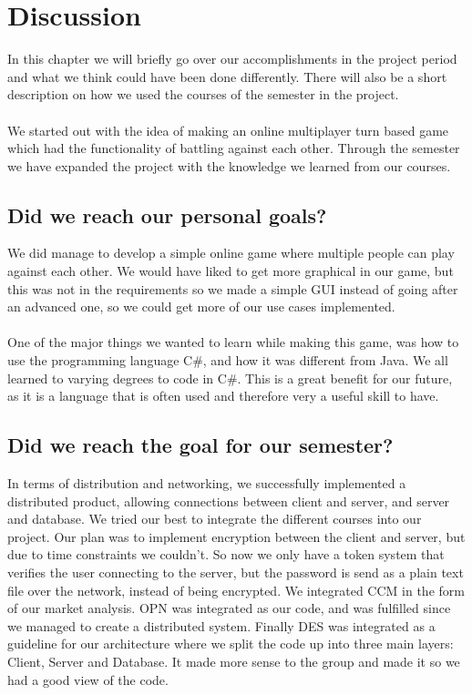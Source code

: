 \chapter{Discussion}
	In this chapter we will briefly go over our accomplishments in the project
   period and what we think could have been done differently. There will also
    be a short description on how we used the courses of the semester in the
     project.
	\\
	\\
	We started out with the idea of making an online multiplayer turn based
   game which had the functionality of battling against each other. Through
    the semester we have expanded the project with the knowledge we learned
     from our courses.
	\\
	\section{Did we reach our personal goals?}
	We did manage to develop a simple online game where multiple people can play
   against each other. We would have liked to get more graphical in our game,
    but this was not in the requirements so we made a simple GUI instead of
    going after an advanced one, so we could get more of our use cases
     implemented.
	\\
	\\
One of the major things we wanted to learn while making this game, was how
 to use the programming language C\#, and how it was different from Java.
 We all learned to varying degrees to code in C\#. This is a great benefit
 for our future, as it is a language that is often used and therefore very
 a useful skill to have.
	\\
	\section{Did we reach the goal for our semester?}
	In terms of distribution and networking, we successfully implemented a
  distributed product, allowing connections between client and server, and
   server and database.
We tried our best to integrate the different courses into our project. Our
 plan was to implement encryption between the client and server, but due to
  time constraints we couldn’t. So now we only have a token system that
   verifies the user connecting to the server, but the password is send as
    a plain text file over the network, instead of being encrypted. We
    integrated CCM in the form of our market analysis. OPN was integrated
     as our code, and was fulfilled since we managed to create a distributed
     system. Finally DES was integrated as a guideline for our architecture
     where we split the code up into three main layers: Client, Server and
     Database. It made more sense to the group and made it so we had a good
      view of the code.
	\\

